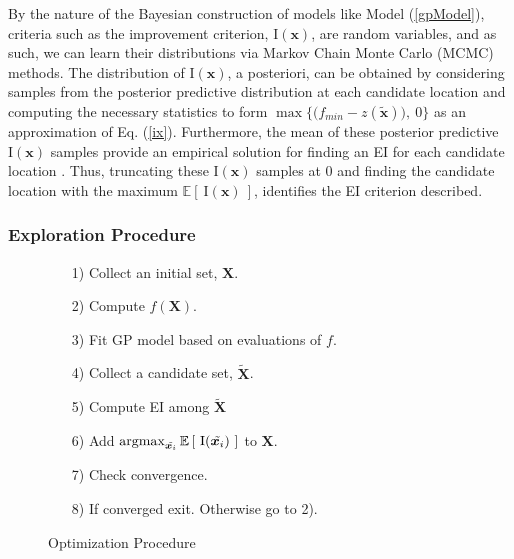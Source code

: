 \documentclass[12pt]{article}
\newcommand{\E}[1]{
        \mathbb{E}\left[~#1~\right]
}
\newcommand{\argmax}{\operatornamewithlimits{argmax}}
\def \Eix {
	\mathbb{E}\left[~\text{I}(\bm{x})~\right]
}
\def \ix {
	\text{I}(\bm{x})
}
\begin{document}
	By the nature of the Bayesian construction of models like Model (\ref{gpModel}), criteria such as the improvement criterion, $\ix$, are random variables, and as such, we can learn their distributions via Markov Chain Monte Carlo (MCMC) methods.
	The distribution of $\ix$, a posteriori, can be obtained by considering samples from the posterior predictive distribution at each candidate location and computing the necessary statistics to form $\max \Big\{ \big(f_{min} - z(\tilde{\bm{x}})\big), ~0 \Big\}$ as an approximation of Eq. (\ref{ix}).  
	Furthermore, the mean of these posterior predictive $\ix$ samples provide an empirical solution for finding an EI for each candidate location \cite{tgp2}.
	Thus, truncating these $\ix$ samples at 0 and finding the candidate location with the maximum $\Eix$, identifies the EI criterion described.

        \subsubsection{Exploration Procedure}
        
	\begin{figure}
	\vspace{-1.6cm}
	\singlespacing
	\caption{Optimization Procedure}
	\begin{itemize}
	\item[1)] Collect an initial set, $\bm{X}$.
	\item[2)] Compute $f(\bm{X})$.
	\item[3)] Fit GP model based on evaluations of $f$.
	\item[4)] Collect a candidate set, $\tilde{\bm{X}}$.
	\item[5)] Compute EI among $\tilde{\bm{X}}$
	\item[6)] Add $\argmax_{\tilde{\bm{x}_i}} \E{\text{I}(\tilde{\bm{x}_i})}$ to $\bm{X}$.
	\item[7)] Check convergence.
	\item[8)] If converged exit. Otherwise go to 2).
	\end{itemize}
	\doublespacing
	\label{procedure}
	\end{figure}
	
\end{document}
